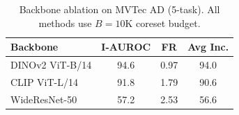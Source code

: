 \begin{table}[t]
\centering
\caption{Backbone ablation on MVTec AD (5-task). All methods use $B=10\text{K}$ coreset budget.}
\label{tab:backbone_ablation}
\begin{tabular}{lccc}
\toprule
Backbone & I-AUROC & FR & Avg Inc. \\
\midrule
DINOv2 ViT-B/14 & 94.6 & 0.97 & 94.0 \\
CLIP ViT-L/14 & 91.8 & 1.79 & 90.6 \\
WideResNet-50 & 57.2 & 2.53 & 56.6 \\
\bottomrule
\end{tabular}
\end{table}